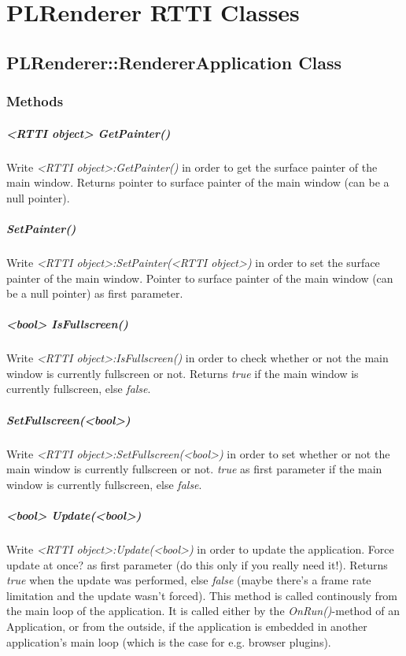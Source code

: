 \chapter{PLRenderer RTTI Classes}




\section{PLRenderer::RendererApplication Class}


\subsection{Methods}

\paragraph{<RTTI object> GetPainter()}
Write \emph{<RTTI object>:GetPainter()} in order to get the surface painter of the main window. Returns pointer to surface painter of the main window (can be a null pointer).

\paragraph{SetPainter()}
Write \emph{<RTTI object>:SetPainter(<RTTI object>)} in order to set the surface painter of the main window. Pointer to surface painter of the main window (can be a null pointer) as first parameter.

\paragraph{<bool> IsFullscreen()}
Write \emph{<RTTI object>:IsFullscreen()} in order to check whether or not the main window is currently fullscreen or not. Returns \emph{true} if the main window is currently fullscreen, else \emph{false}.

\paragraph{SetFullscreen(<bool>)}
Write \emph{<RTTI object>:SetFullscreen(<bool>)} in order to set whether or not the main window is currently fullscreen or not. \emph{true} as first parameter if the main window is currently fullscreen, else \emph{false}.

\paragraph{<bool> Update(<bool>)}
Write \emph{<RTTI object>:Update(<bool>)} in order to update the application. Force update at once? as first parameter (do this only if you really need it!). Returns \emph{true} when the update was performed, else \emph{false} (maybe there's a frame rate limitation and the update wasn't forced). This method is called continously from the main loop of the application. It is called either by the \emph{OnRun()}-method of an Application, or from the outside, if the application is embedded in another application's main loop (which is the case for e.g. browser plugins).
